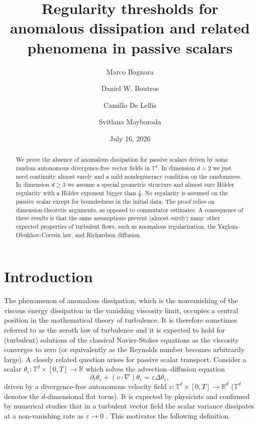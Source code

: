 \documentclass[11pt,reqno]{amsart}
\title[Thresholds for anomalous dissipation]
{Regularity thresholds for anomalous dissipation and related phenomena in passive scalars}
\author[M. Bagnara]{Marco Bagnara}
\author[D.W. Boutros]{Daniel W. Boutros}
\author[C. De Lellis]{Camillo De Lellis}
\author[S. Mayboroda]{Svitlana Mayboroda}
\date{July 16, 2026}
\theoremstyle{definition}
\numberwithin{equation}{section}
\begin{document}
\begin{abstract}
We prove the absence of anomalous dissipation for passive scalars driven by some random autonomous divergence-free vector fields in $\mathbb T^d$. In dimension $d=2$ we just need continuity almost surely and a mild nondegeneracy condition on the randomness. In dimension $d\geq 3$ we assume a special geometric structure and almost sure H\"older regularity with a H\"older exponent bigger than $\frac{1}{8}$. No regularity is assumed on the passive scalar except for boundedness in the initial data. The proof relies on dimension-theoretic arguments, as opposed to commutator estimates. A consequence of these results is that the same assumptions prevent (almost surely) many other expected properties of turbulent flows, such as anomalous regularization, the Yaglom-Obukhov-Corrsin law, and Richardson diffusion.
\end{abstract}

\maketitle

\tableofcontents

\section{Introduction}

The phenomenon of anomalous dissipation, which is the nonvanishing of the viscous energy dissipation in the vanishing viscosity limit, occupies a central position in the mathematical theory of turbulence. It is therefore sometimes referred to as the zeroth law of turbulence and it is expected to hold for (turbulent) solutions of the classical Navier-Stokes equations as the viscosity converges to zero (or equivalently as the Reynolds number becomes arbitrarily large). 
A closely related question arises for passive scalar transport. Consider a scalar $\theta_\varepsilon : \mathbb{T}^d \times [0,T] \rightarrow \mathbb{R}$ which solves the advection--diffusion equation
\begin{equation}\label{eq:advection_diffusion}
\partial_t \theta_\varepsilon + (v\cdot\nabla)\theta_\varepsilon
= \varepsilon \Delta \theta_\varepsilon,
\end{equation}
driven by a divergence-free autonomous velocity field $v : \mathbb{T}^d \times [0,T]\rightarrow \mathbb{R}^d$ ($\mathbb T^d$ denotes the $d$-dimensional flat torus). It is expected by physicists and confirmed by numerical studies that in a turbulent vector field the scalar variance dissipates at a non-vanishing rate as $\varepsilon \to 0$ \cite{ShraimanSiggia2000,DonzisSreenivasanYeung2005,Sreenivasan2019, Warhaft2000}. This motivates the following definition.
\end{document}
